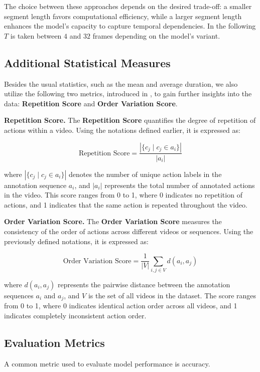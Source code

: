 The choice between these approaches depends on the desired trade-off: a smaller segment length favors computational efficiency, while a larger segment length enhances the model's capacity to capture temporal dependencies. In the following $T$ is taken between $4$ and $32$ frames depending on the model's variant.

\subsection{Additional Statistical Measures}

Besides the usual statistics, such as the mean and average duration, we also utilize the following two metrics, introduced in \cite{tas-survey}, to gain further insights into the data: \textbf{Repetition Score} and \textbf{Order Variation Score}.

\noindent\textbf{Repetition Score.}  
The \textbf{Repetition Score} quantifies the degree of repetition of actions within a video. Using the notations defined earlier, it is expressed as:  

\[
\text{Repetition Score} = \frac{|\{c_j \mid c_j \in a_i\}|}{|a_i|}
\]

where \( |\{c_j \mid c_j \in a_i\}| \) denotes the number of unique action labels in the annotation sequence \( a_i \), and \( |a_i| \) represents the total number of annotated actions in the video. This score ranges from 0 to 1, where 0 indicates no repetition of actions, and 1 indicates that the same action is repeated throughout the video.

\noindent\textbf{Order Variation Score.}  
The \textbf{Order Variation Score} measures the consistency of the order of actions across different videos or sequences. Using the previously defined notations, it is expressed as:  

\[
\text{Order Variation Score} = \frac{1}{|V|} \sum_{i, j \in V} d(a_i, a_j)
\]

where \(d(a_i, a_j)\) represents the pairwise distance between the annotation sequences \(a_i\) and \(a_j\), and \(V\) is the set of all videos in the dataset. The score ranges from 0 to 1, where 0 indicates identical action order across all videos, and 1 indicates completely inconsistent action order.  

\subsection{Evaluation Metrics}

A common metric used to evaluate model performance is accuracy.

